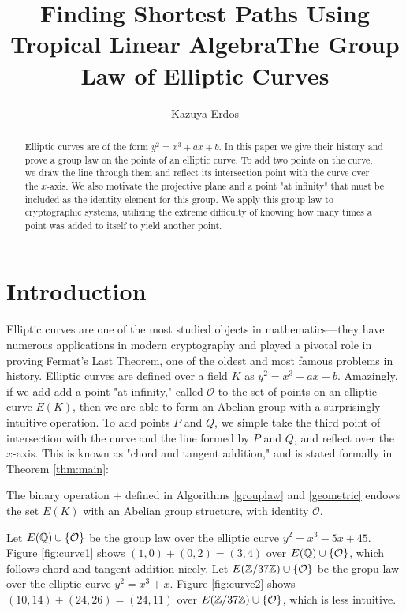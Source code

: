 \documentclass[]{../../math_paper}
\title{Finding Shortest Paths Using Tropical Linear Algebra}
\author{Kazuya Erdos}
\title{The Group Law of Elliptic Curves}
\begin{document}
\maketitle

\begin{abstract}
    Elliptic curves are of the form $y^2 = x^3 + ax + b$. In this paper we give their history and prove a group law on the points of an elliptic curve. To add two points on the curve, we draw the line through them and reflect its intersection point with the curve over the $x$-axis. We also motivate the projective plane and a point "at infinity" that must be included as the identity element for this group. We apply this group law to cryptographic systems, utilizing the extreme difficulty of knowing how many times a point was added to itself to yield another point.
\end{abstract}
\section{Introduction}
Elliptic curves are one of the most studied objects in mathematics---they have numerous applications in modern cryptography and played a pivotal role in proving Fermat's Last Theorem, one of the oldest and most famous problems in history. Elliptic curves are defined over a field $K$ as $y^2 = x^3 + ax + b$. Amazingly, if we add add a point "at infinity," called $\mathcal{O}$ to the set of points on an elliptic curve $E(K)$, then we are able to form an Abelian group with a surprisingly intuitive operation. To add points $P$ and $Q$, we simple take the third point of intersection with the curve and the line formed by $P$ and $Q$, and reflect over the $x$-axis. This is known as "chord and tangent addition," and is stated formally in Theorem \ref{thm:main}:

\begin{maintheorema}
    The binary operation $+$ defined in Algorithms \ref{grouplaw} and \ref{geometric} endows the set $E(K)$ with an Abelian group structure, with identity $\mathcal{O}$.
\end{maintheorema}

\begin{example}
    Let $E(\mathbb{Q}) \cup \{\mathcal{O}\}$ be the group law over the elliptic curve $y^2 = x^3 - 5x + 45$. Figure \ref{fig:curve1} shows $(1, 0) + (0, 2) = (3, 4)$ over $E(\mathbb{Q}) \cup \{\mathcal{O}\}$, which follows chord and tangent addition nicely. Let $E(\mathbb{Z}/37\mathbb{Z}) \cup \{\mathcal{O}\}$ be the gropu law over the elliptic curve $y^2 = x^3 + x$. Figure \ref{fig:curve2} shows $(10, 14) + (24, 26) = (24, 11)$ over $E(\mathbb{Z}/37\mathbb{Z}) \cup \{\mathcal{O}\}$, which is less intuitive.
\end{example}
\end{document}

